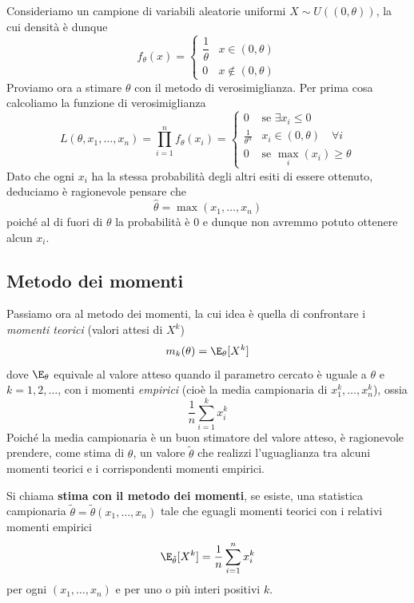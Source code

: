 \begin{example}
	Consideriamo un campione di variabili aleatorie uniformi $X \sim U((0,
	\theta))$, la cui densità è dunque
	\[
		f_\theta (x) = \begin{cases}
			\dfrac{1}{\theta} & x \in (0, \theta)    \\[2ex]
			0                 & x \notin (0, \theta)
		\end{cases}
	\]
	Proviamo ora a stimare $\theta$ con il metodo di verosimiglianza. Per prima cosa calcoliamo la
	funzione di verosimiglianza
	\[
		L(\theta, x_1, \dots, x_n) = \prod_{i=1}^n f_\theta(x_i) = \begin{cases}
			0                  & \text{se } \exists x_i \leq 0       \\
			\frac{1}{\theta^n} & x_i \in (0, \theta) \quad \forall i \\
			0                  & \text{se } \max_i (x_i) \geq \theta
		\end{cases}
	\]
	Dato che ogni $x_i$ ha la stessa probabilità degli altri esiti di essere ottenuto, deduciamo è
	ragionevole pensare che
	\[ \hat{\theta} = \max(x_1, \dots, x_n) \]
	poiché al di fuori di $\theta$ la probabilità è 0 e dunque non avremmo potuto ottenere alcun
	$x_i$.
\end{example}

\subsection{Metodo dei momenti}
Passiamo ora al metodo dei momenti, la cui idea è quella di confrontare i \emph{momenti teorici}
(valori attesi di $X^k$)
\[ m_k(\theta) = \E_\theta [X^k] \]
dove $\E_\theta$ equivale al valore atteso quando il parametro cercato è uguale a $\theta$ e
$k = 1,2,\dots$, con i momenti \emph{empirici} (cioè la media campionaria di $x_1^k, \dots, x_n^k$),
ossia
\[ \frac{1}{n} \sum_{i=1}^k x_i^k \]
Poiché la media campionaria è un buon stimatore del valore atteso, è ragionevole prendere, come
stima di $\theta$, un valore $\tilde{\theta}$ che realizzi l'uguaglianza tra alcuni momenti teorici
e i corrispondenti momenti empirici.

\begin{definition}
	Si chiama \textbf{stima con il metodo dei momenti}, se esiste, una statistica campionaria
	$\tilde{\theta} = \tilde{\theta}(x_1, \dots, x_n)$ tale che eguagli momenti teorici con i
	relativi momenti empirici
	\[ \E_{\tilde{\theta}} [X^k] = \frac{1}{n} \sum_{i=1}^{n} x_i^k \]
	per ogni $(x_1, \dots, x_n)$ e per uno o più interi positivi $k$.
\end{definition}


